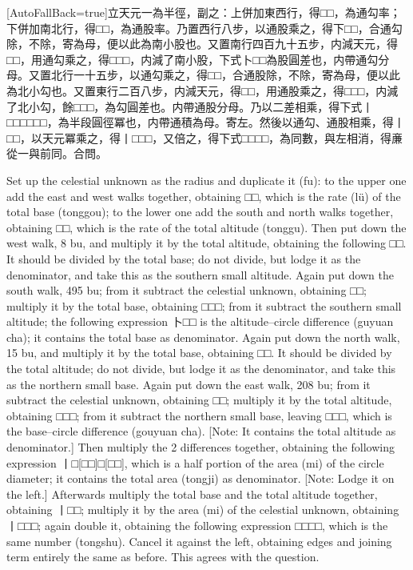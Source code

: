\documentclass[11pt]{article}
\newcommand{\zhsmall}{\footnotesize\color{black!70}}
\newcommand{\unitlabel}[1]{\marginpar{\raggedleft\tiny\color{gray}#1}}
\newenvironment{unitzh}{\par\CJKfontspec{Noto Serif CJK SC}[AutoFallBack=true]\large\linespread{1.25}\selectfont}{\par}
\newenvironment{uniten}{\par\small\color{black!85}}{\par\medskip}
\begin{document}
\begin{unitzh}\unitlabel{ceyuan-031.4}立天元一為半徑，副之：上併加東西行，得□□，為通勾率；下併加南北行，得□□，為通股率。乃置西行八步，以通股乘之，得下□□，合通勾除，不除，寄為母，便以此為南小股也。又置南行四百九十五步，内減天元，得□□，用通勾乘之，得□□□，内減了南小股，下式卜□□為股圓差也，内帶通勾分母。又置北行一十五步，以通勾乘之，得□□，合通股除，不除，寄為母，便以此為北小勾也。又置東行二百八步，内減天元，得□□，用通股乘之，得□□□，内減了北小勾，餘□□□，為勾圓差也。{\zhsmall 内帶通股分母。}乃以二差相乘，得下式丨□{\zhsmall □□}□{\zhsmall □□}，為半段圓徑冪也，内帶通積為母。{\zhsmall 寄左。}然後以通勾、通股相乘，得丨□□，以天元冪乘之，得丨□□□，又倍之，得下式□□□□，為同數，與左相消，得亷從一與前同。合問。\end{unitzh}
\begin{uniten}Set up the celestial unknown as the radius and duplicate it (fu): to the upper one add the east and west walks together, obtaining □□, which is the rate (lü) of the total base (tonggou); to the lower one add the south and north walks together, obtaining □□, which is the rate of the total altitude (tonggu). Then put down the west walk, 8 bu, and multiply it by the total altitude, obtaining the following □□. It should be divided by the total base; do not divide, but lodge it as the denominator, and take this as the southern small altitude. Again put down the south walk, 495 bu; from it subtract the celestial unknown, obtaining □□; multiply it by the total base, obtaining □□□; from it subtract the southern small altitude; the following expression 卜□□ is the altitude–circle difference (guyuan cha); it contains the total base as denominator. Again put down the north walk, 15 bu, and multiply it by the total base, obtaining □□. It should be divided by the total altitude; do not divide, but lodge it as the denominator, and take this as the northern small base. Again put down the east walk, 208 bu; from it subtract the celestial unknown, obtaining □□; multiply it by the total altitude, obtaining □□□; from it subtract the northern small base, leaving □□□, which is the base–circle difference (gouyuan cha). [Note: It contains the total altitude as denominator.] Then multiply the 2 differences together, obtaining the following expression 丨□[□□]□[□□], which is a half portion of the area (mi) of the circle diameter; it contains the total area (tongji) as denominator. [Note: Lodge it on the left.] Afterwards multiply the total base and the total altitude together, obtaining 丨□□; multiply it by the area (mi) of the celestial unknown, obtaining 丨□□□; again double it, obtaining the following expression □□□□, which is the same number (tongshu). Cancel it against the left, obtaining edges and joining term entirely the same as before. This agrees with the question.\end{uniten}
\end{document}
